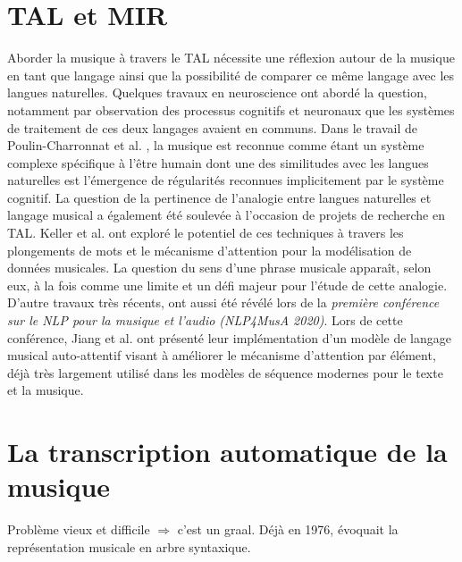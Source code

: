\section{TAL et MIR}
Aborder la musique à travers le TAL nécessite une réflexion autour de la musique en tant que langage ainsi que la possibilité de comparer ce même langage avec les langues naturelles. Quelques travaux en neuroscience ont abordé la question, notamment par observation des processus cognitifs et neuronaux que les systèmes de traitement de ces deux langages avaient en communs. Dans le travail de Poulin-Charronnat et al. \cite{poulincharronnat:hal-01985213}, la musique est reconnue comme étant un système complexe spécifique à l’être humain dont une des similitudes avec les langues naturelles est l’émergence de régularités reconnues implicitement par le système cognitif. La question de la pertinence de l’analogie entre langues naturelles et langage musical a également été soulevée à l’occasion de projets de recherche en TAL. Keller et al. \cite{keller:hal-03279850} ont exploré le potentiel de ces techniques à travers les plongements de mots et le mécanisme d’attention pour la modélisation de données musicales. La question du sens d’une phrase musicale apparaît, selon eux, à la fois comme une limite et un défi majeur pour l’étude de cette analogie.\\
D’autre travaux très récents, ont aussi été révélé lors de la \textit{première conférence sur le NLP pour la musique et l'audio (NLP4MusA 2020)}. Lors de cette conférence, Jiang et al. \cite{Jiang2020DiscoveringMR} ont présenté leur implémentation d’un modèle de langage musical auto-attentif visant à améliorer le mécanisme d'attention par élément, déjà très largement utilisé dans les modèles de séquence modernes pour le texte et la musique.
\section{La transcription automatique de la musique}
Problème vieux et difficile $\Rightarrow$ c’est un graal.
Déjà en 1976, \cite{first_one} évoquait la représentation musicale en arbre syntaxique. 
